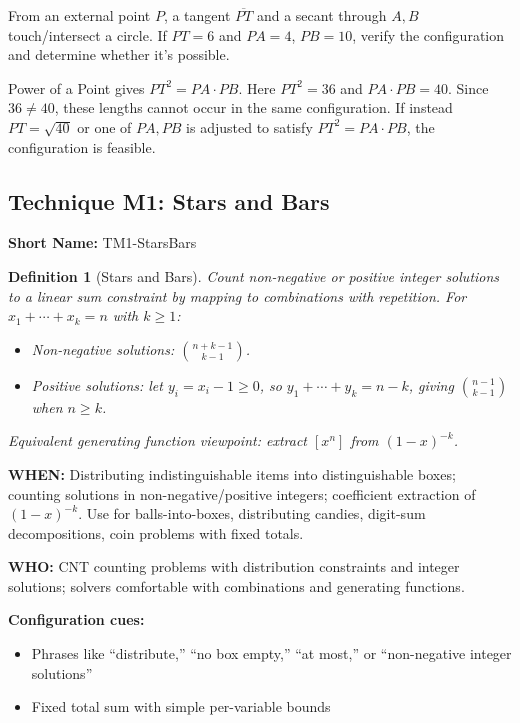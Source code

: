 \documentclass[12pt]{article}
\newtheorem{definition}{Definition}[section]
\newenvironment{problem}[1]
{\begin{tcolorbox}[colback=blue!5!white,colframe=blue!75!black,title={#1}]}{\end{tcolorbox}}
\newenvironment{solution}
{\begin{tcolorbox}[colback=green!5!white,colframe=green!75!black,title={Solution}]}{\end{tcolorbox}}
\begin{document}
\begin{problem}{Example: Tangent–Secant}
From an external point $P$, a tangent $\overline{PT}$ and a secant through $A,B$ touch/intersect a circle. If $PT = 6$ and $PA = 4$, $PB = 10$, verify the configuration and determine whether it's possible.
\end{problem}

\begin{solution}
Power of a Point gives $PT^2 = PA\cdot PB$. Here $PT^2 = 36$ and $PA\cdot PB = 40$. Since $36 \ne 40$, these lengths cannot occur in the same configuration. If instead $PT = \sqrt{40}$ or one of $PA, PB$ is adjusted to satisfy $PT^2 = PA\cdot PB$, the configuration is feasible.
\end{solution}

\subsection{Technique M1: Stars and Bars}
\textbf{Short Name:} TM1-StarsBars

\begin{definition}[Stars and Bars]
Count non\mbox{-}negative or positive integer solutions to a linear sum constraint by mapping to combinations with repetition. For $x_1 + \cdots + x_k = n$ with $k \ge 1$:
\begin{itemize}
    \item Non\mbox{-}negative solutions: $\displaystyle \binom{n+k-1}{k-1}$.
    \item Positive solutions: let $y_i = x_i - 1 \ge 0$, so $y_1 + \cdots + y_k = n-k$, giving $\displaystyle \binom{n-1}{k-1}$ when $n \ge k$.
\end{itemize}
Equivalent generating function viewpoint: extract $[x^n]$ from $(1 - x)^{-k}$.
\end{definition}

\textbf{WHEN:} Distributing indistinguishable items into distinguishable boxes; counting solutions in non\mbox{-}negative/positive integers; coefficient extraction of $(1-x)^{-k}$. Use for balls\mbox{-}into\mbox{-}boxes, distributing candies, digit\mbox{-}sum decompositions, coin problems with fixed totals.

\textbf{WHO:} CNT counting problems with distribution constraints and integer solutions; solvers comfortable with combinations and generating functions.

\textbf{Configuration cues:}
\begin{itemize}
    \item Phrases like ``distribute,'' ``no box empty,'' ``at most,'' or ``non\mbox{-}negative integer solutions''
    \item Fixed total sum with simple per\mbox{-}variable bounds
\end{itemize}
\end{document}
